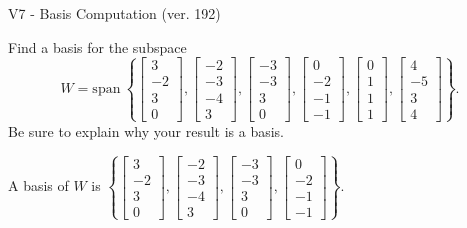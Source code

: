 \begin{exercise}
  \begin{exerciseTitle}V7 - Basis Computation (ver. 192)\end{exerciseTitle}
  \begin{exerciseStatement}
    Find a basis for the subspace 
\[W=\mathrm{span}\ \left\{\left[\begin{array}{r}
3 \\
-2 \\
3 \\
0
\end{array}\right] , \left[\begin{array}{r}
-2 \\
-3 \\
-4 \\
3
\end{array}\right] , \left[\begin{array}{r}
-3 \\
-3 \\
3 \\
0
\end{array}\right] , \left[\begin{array}{r}
0 \\
-2 \\
-1 \\
-1
\end{array}\right] , \left[\begin{array}{r}
0 \\
1 \\
1 \\
1
\end{array}\right] , \left[\begin{array}{r}
4 \\
-5 \\
3 \\
4
\end{array}\right]\right\}.\]
 Be sure to explain why your result is a basis.


  \end{exerciseStatement}
  \begin{exerciseAnswer}
   A basis of \(W\) is  \(\left\{\left[\begin{array}{r}
3 \\
-2 \\
3 \\
0
\end{array}\right] , \left[\begin{array}{r}
-2 \\
-3 \\
-4 \\
3
\end{array}\right] , \left[\begin{array}{r}
-3 \\
-3 \\
3 \\
0
\end{array}\right] , \left[\begin{array}{r}
0 \\
-2 \\
-1 \\
-1
\end{array}\right]\right\}\).
  


  \end{exerciseAnswer}
\end{exercise}